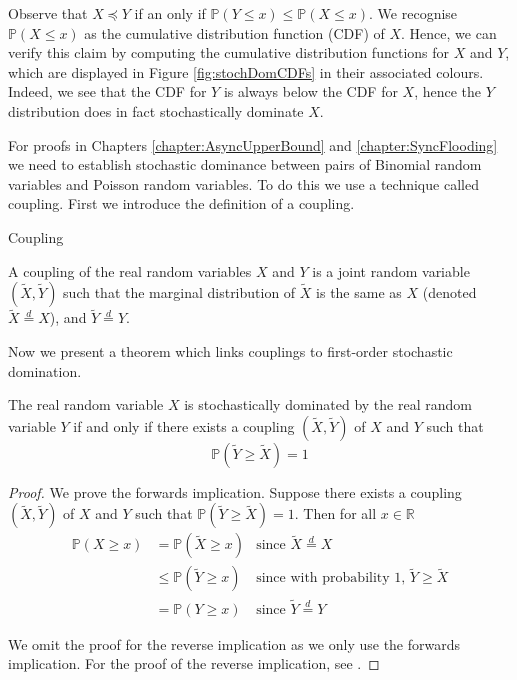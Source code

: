 Observe that $X \preceq Y$ if an only if $\mathbb{P}(Y \leq x) \leq \mathbb{P}(X \leq x)$. We recognise $\mathbb{P}(X \leq x)$ as the cumulative distribution function (CDF) of $X$. Hence, we can verify this claim by computing the cumulative  distribution functions for $X$ and $Y$, which are displayed in Figure \ref{fig:stochDomCDFs} in their associated colours. Indeed, we see that the CDF for $Y$ is always below the CDF for $X$, hence the $Y$ distribution does in fact stochastically dominate $X$.

For proofs in Chapters \ref{chapter:AsyncUpperBound} and \ref{chapter:SyncFlooding} we need to establish stochastic dominance between pairs of Binomial random variables and Poisson random variables. To do this we use a technique called coupling. First we introduce the definition of a coupling.

\begin{definition} %
	Coupling

	\noindent
	A coupling of the real random variables $X$ and $Y$ is a joint random variable $(\tilde{X}, \tilde{Y})$ such that the marginal distribution of $\tilde{X}$ is the same as $X$ (denoted $\tilde{X} \stackrel{d}{=} X$), and $\tilde{Y} \stackrel{d}{=} Y$.
\end{definition}


Now we present a theorem which links couplings to first-order stochastic domination.

\begin{theorem}\label{theorem:couplingDomination}
	The real random variable $X$ is stochastically dominated by the real random variable $Y$ if and only if there exists a coupling $(\tilde{X}, \tilde{Y})$ of $X$ and $Y$ such that
	$$
		\mathbb{P}(\tilde{Y} \geq \tilde{X}) = 1
	$$
\end{theorem}

\begin{proof}
	We prove the forwards implication. Suppose there exists a coupling $(\tilde{X}, \tilde{Y})$ of $X$ and $Y$ such that $\mathbb{P}(\tilde{Y} \geq \tilde{X}) = 1$. Then for all $x \in \mathbb{R}$
	\begin{align*}
		\mathbb{P}(X \geq x) &= \mathbb{P}(\tilde{X} \geq x) & \text{since } \tilde{X} \stackrel{d}{=} X \\
		&\leq \mathbb{P}(\tilde{Y} \geq x) & \text{since with probability 1, } \tilde{Y} \geq \tilde{X} \\
		&= \mathbb{P}(Y \geq x) & \text{since } \tilde{Y} \stackrel{d}{=} Y 
	\end{align*}

	We omit the proof for the reverse implication as we only use the forwards implication. For the proof of the reverse implication, see \cite{coupling}.
\end{proof}

